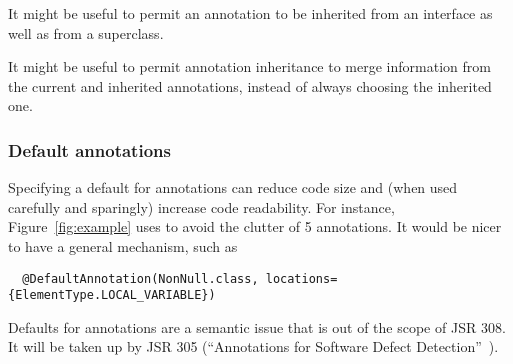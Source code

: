 \documentclass[10pt]{article}
\begin{document}
It might be useful to permit an annotation to be inherited from an
interface as well as from a superclass.

It might be useful to permit annotation inheritance to merge
information from the current and inherited annotations, instead of always
choosing the inherited one.





% 
% 

\subsubsection{Default annotations\label{default-annotations}}

Specifying a default for annotations can reduce code size and (when used
carefully and sparingly) increase code readability.  For instance,
Figure~\ref{fig:example} uses  to avoid the clutter of 5
 annotations.  It would be nicer to have a general mechanism,
such as
\begin{Verbatim}
  @DefaultAnnotation(NonNull.class, locations={ElementType.LOCAL_VARIABLE})
\end{Verbatim}
Defaults for annotations are a semantic issue that is
out of the scope of JSR 308.  It will be taken up by JSR 305 (``Annotations
for Software Defect Detection''~\cite{JSR305}).
\end{document}
